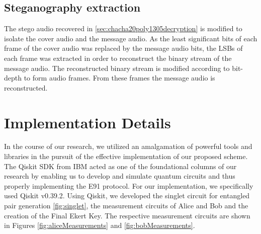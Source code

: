 \documentclass{article}
\begin{document}
\subsection{Steganography extraction}
\label{sec:stegoExtract}
The stego audio recovered in \ref{sec:chacha20poly1305decryption} is modified to isolate the cover audio and the message audio. As the least significant bits of each frame of the cover audio was replaced by the message audio bits, the LSBs of each frame was extracted in order to reconstruct the binary stream of the message audio. The reconstructed binary stream is modified according to bit-depth to form audio frames. From these frames the message audio is reconstructed.
\section{Implementation Details}
\label{sec:implementation}
In the course of our research, we utilized an amalgamation of powerful tools and libraries in the pursuit of the effective implementation of our proposed scheme. The Qiskit SDK from IBM \cite{Wille2019IBMsQT} acted as one of the foundational columns of our research by enabling us to develop and simulate quantum circuits and thus properly implementing the E91 protocol. For our implementation, we specifically used Qiskit v0.39.2. Using Qiskit, we developed the singlet circuit for entangled pair generation \ref{fig:singlet}, the measurement circuits of Alice and Bob and the creation of the Final Ekert Key. The respective measurement circuits are shown in Figures \ref{fig:aliceMeasurements} and \ref{fig:bobMeasurements}.
\end{document}
